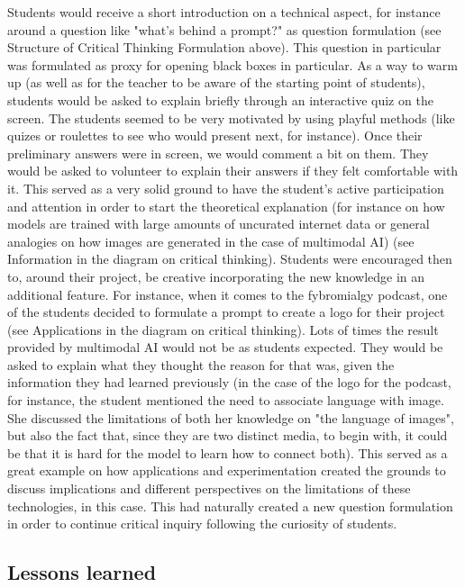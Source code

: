 \documentclass{article}
\begin{document}
Students would receive a short introduction on a technical aspect, for instance around a question like "what's behind a prompt?" as question formulation (see Structure of Critical Thinking Formulation above). This question in particular was formulated as proxy for opening black boxes in particular. As a way to warm up (as well as for the teacher to be aware of the starting point of students), students would be asked to explain briefly through an interactive quiz on the screen. The students seemed to be very motivated by using playful methods (like quizes or roulettes to see who would present next, for instance). Once their preliminary answers were in screen, we would comment a bit on them. They would be asked to volunteer to explain their answers if they felt comfortable with it. This served as a very solid ground to have the student's active participation and attention in order to start the theoretical explanation (for instance on how models are trained with large amounts of uncurated internet data or general analogies on how images are generated in the case of multimodal AI) (see Information in the diagram on critical thinking). Students were encouraged then to, around their project, be creative incorporating the new knowledge in an additional feature. For instance, when it comes to the fybromialgy podcast, one of the students decided to formulate a prompt to create a logo for their project (see Applications in the diagram on critical thinking). Lots of times the result provided by multimodal AI would not be as students expected. They would be asked to explain what they thought the reason for that was, given the information they had learned previously (in the case of the logo for the podcast, for instance, the student mentioned the need to associate language with image. She discussed the limitations of both her knowledge on "the language of images", but also the fact that, since they are two distinct media, to begin with, it could be that it is hard for the model to learn how to connect both). This served as a great example on how applications and experimentation created the grounds to discuss implications and different perspectives on the limitations of these technologies, in this case. This had naturally created a new question formulation in order to continue critical inquiry following the curiosity of students.


\subsection{Lessons learned}
\end{document}
